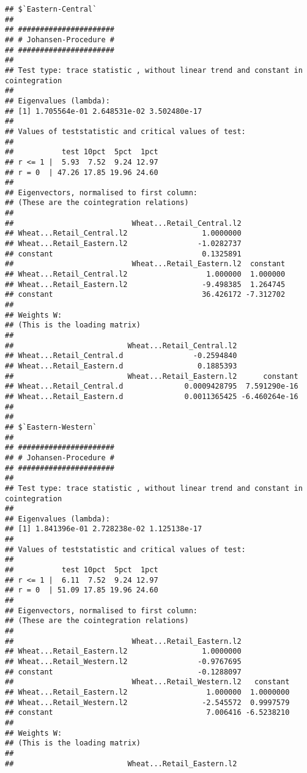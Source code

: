 \documentclass[12pt,]{article}
\begin{document}
\begin{verbatim}
## $`Eastern-Central`
## 
## ###################### 
## # Johansen-Procedure # 
## ###################### 
## 
## Test type: trace statistic , without linear trend and constant in cointegration 
## 
## Eigenvalues (lambda):
## [1] 1.705564e-01 2.648531e-02 3.502480e-17
## 
## Values of teststatistic and critical values of test:
## 
##           test 10pct  5pct  1pct
## r <= 1 |  5.93  7.52  9.24 12.97
## r = 0  | 47.26 17.85 19.96 24.60
## 
## Eigenvectors, normalised to first column:
## (These are the cointegration relations)
## 
##                           Wheat...Retail_Central.l2
## Wheat...Retail_Central.l2                 1.0000000
## Wheat...Retail_Eastern.l2                -1.0282737
## constant                                  0.1325891
##                           Wheat...Retail_Eastern.l2  constant
## Wheat...Retail_Central.l2                  1.000000  1.000000
## Wheat...Retail_Eastern.l2                 -9.498385  1.264745
## constant                                  36.426172 -7.312702
## 
## Weights W:
## (This is the loading matrix)
## 
##                          Wheat...Retail_Central.l2
## Wheat...Retail_Central.d                -0.2594840
## Wheat...Retail_Eastern.d                 0.1885393
##                          Wheat...Retail_Eastern.l2      constant
## Wheat...Retail_Central.d              0.0009428795  7.591290e-16
## Wheat...Retail_Eastern.d              0.0011365425 -6.460264e-16
## 
## 
## $`Eastern-Western`
## 
## ###################### 
## # Johansen-Procedure # 
## ###################### 
## 
## Test type: trace statistic , without linear trend and constant in cointegration 
## 
## Eigenvalues (lambda):
## [1] 1.841396e-01 2.728238e-02 1.125138e-17
## 
## Values of teststatistic and critical values of test:
## 
##           test 10pct  5pct  1pct
## r <= 1 |  6.11  7.52  9.24 12.97
## r = 0  | 51.09 17.85 19.96 24.60
## 
## Eigenvectors, normalised to first column:
## (These are the cointegration relations)
## 
##                           Wheat...Retail_Eastern.l2
## Wheat...Retail_Eastern.l2                 1.0000000
## Wheat...Retail_Western.l2                -0.9767695
## constant                                 -0.1288097
##                           Wheat...Retail_Western.l2   constant
## Wheat...Retail_Eastern.l2                  1.000000  1.0000000
## Wheat...Retail_Western.l2                 -2.545572  0.9997579
## constant                                   7.006416 -6.5238210
## 
## Weights W:
## (This is the loading matrix)
## 
##                          Wheat...Retail_Eastern.l2

\end{verbatim}
\end{document}
